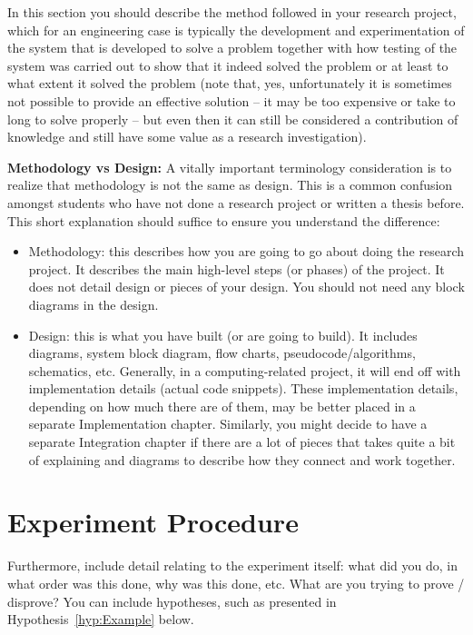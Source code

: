 
In this section you should describe the method followed in your research project, which for an engineering case is typically the development and experimentation of the system that is developed to solve a problem together with how testing of the system was carried out to show that it indeed solved the problem or at least to what extent it solved the problem (note that, yes, unfortunately it is sometimes not possible to provide an effective solution -- it may be too expensive or take to long to solve properly -- but even then it can still be considered a contribution of knowledge and still have some value as a research investigation).

\textbf{Methodology vs Design:} A vitally important terminology consideration is to realize that  methodology is not the same as design. This is a common confusion amongst students who have not done a research project or written a thesis before. This short explanation should suffice to ensure you understand the difference:

\begin{itemize}
	\item Methodology: this describes how you are going to go about doing the research project. It describes the main high-level steps (or phases) of the project. It does not detail design or pieces of your design. You should not need any block diagrams in the design.
	\item Design: this is what you have built (or are going to build). It includes diagrams, system block diagram, flow charts, pseudocode/algorithms, schematics, etc. Generally, in a computing-related project, it will end off with implementation details (actual code snippets). These implementation details, depending on how much there are of them, may be better placed in a separate Implementation chapter. Similarly, you might decide to have a separate Integration chapter if there are a lot of pieces that takes quite a bit of explaining and diagrams to describe how they connect and work together. 
\end{itemize}



\section{Experiment Procedure}

Furthermore, include detail relating to the experiment itself: what did you do, in what order was this done, why was this done, etc.  What are you trying to prove / disprove?  You can include hypotheses, such as presented in Hypothesis~\ref{hyp:Example} below.

